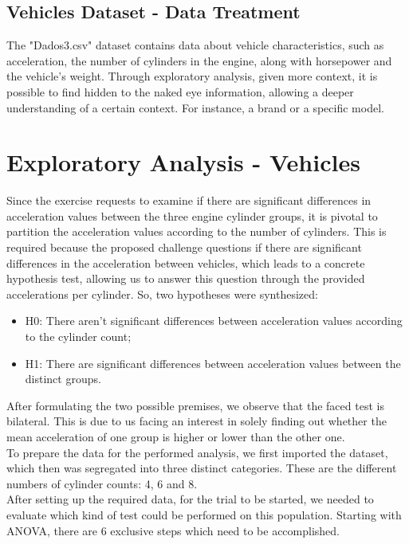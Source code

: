 \documentclass[conference]{IEEEtran}
\begin{document}
\subsection{Vehicles Dataset - Data Treatment}
The "Dados3.csv" dataset contains data about vehicle characteristics, such as acceleration, the number of cylinders in the engine, along with horsepower and the vehicle's weight.
Through exploratory analysis, given more context, it is possible to find hidden to the naked eye information, allowing a deeper understanding of a certain context.
For instance, a brand or a specific model.
\section{Exploratory Analysis - Vehicles}
Since the exercise requests to examine if there are significant differences in acceleration values between the three engine cylinder groups, it is pivotal to partition the acceleration values according to the number of cylinders. 
This is required because the proposed challenge questions if there are significant differences in the acceleration between vehicles, which leads to a concrete hypothesis test, allowing us to answer this question through the provided accelerations per cylinder.
So, two hypotheses were synthesized:
    \begin{itemize}
        \item H0: There aren't significant differences between acceleration values according to the cylinder count;
        \item H1: There are significant differences between acceleration values between the distinct groups.
    \end{itemize}
After formulating the two possible premises, we observe that the faced test is bilateral.
This is due to us facing an interest in solely finding out whether the mean acceleration of one group is higher or lower than the other one.\\

To prepare the data for the performed analysis, we first imported the dataset, which then was segregated into three distinct categories. 
These are the different numbers of cylinder counts: 4, 6 and 8.\\

After setting up the required data, for the trial to be started, we needed to evaluate which kind of test could be performed on this population. 
Starting with ANOVA, there are 6 exclusive steps which need to be accomplished.\\
\end{document}
